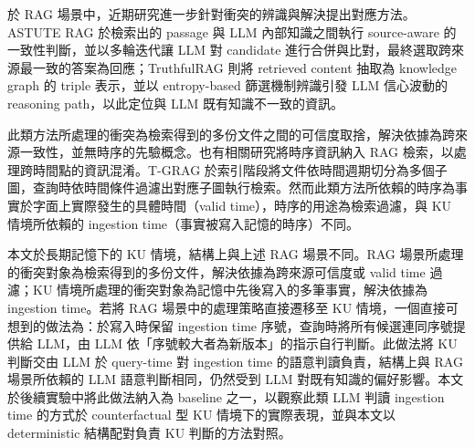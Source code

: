 於 RAG 場景中，近期研究進一步針對衝突的辨識與解決提出對應方法。ASTUTE RAG \cite{wang-etal-2025-astute} 於檢索出的 passage 與 LLM 內部知識之間執行 source-aware 的一致性判斷，並以多輪迭代讓 LLM 對 candidate 進行合併與比對，最終選取跨來源最一致的答案為回應；TruthfulRAG \cite{liu2026truthfulrag} 則將 retrieved content 抽取為 knowledge graph 的 triple 表示，並以 entropy-based 篩選機制辨識引發 LLM 信心波動的 reasoning path，以此定位與 LLM 既有知識不一致的資訊。

此類方法所處理的衝突為檢索得到的多份文件之間的可信度取捨，解決依據為跨來源一致性，並無時序的先驗概念。也有相關研究將時序資訊納入 RAG 檢索，以處理跨時間點的資訊混淆。T-GRAG \cite{li2025t} 於索引階段將文件依時間週期切分為多個子圖，查詢時依時間條件過濾出對應子圖執行檢索。然而此類方法所依賴的時序為事實於字面上實際發生的具體時間（valid time），時序的用途為檢索過濾，與 KU 情境所依賴的 ingestion time（事實被寫入記憶的時序）不同。

本文於長期記憶下的 KU 情境，結構上與上述 RAG 場景不同。RAG 場景所處理的衝突對象為檢索得到的多份文件，解決依據為跨來源可信度或 valid time 過濾；KU 情境所處理的衝突對象為記憶中先後寫入的多筆事實，解決依據為 ingestion time。若將 RAG 場景中的處理策略直接遷移至 KU 情境，一個直接可想到的做法為：於寫入時保留 ingestion time 序號，查詢時將所有候選連同序號提供給 LLM，由 LLM 依「序號較大者為新版本」的指示自行判斷。此做法將 KU 判斷交由 LLM 於 query-time 對 ingestion time 的語意判讀負責，結構上與 RAG 場景所依賴的 LLM 語意判斷相同，仍然受到 LLM 對既有知識的偏好影響。本文於後續實驗中將此做法納入為 baseline 之一，以觀察此類 LLM 判讀 ingestion time 的方式於 counterfactual 型 KU 情境下的實際表現，並與本文以 deterministic 結構配對負責 KU 判斷的方法對照。